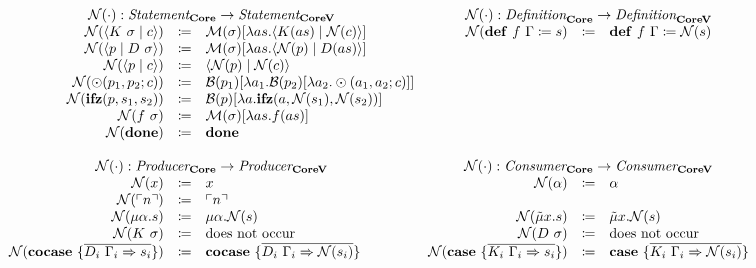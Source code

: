 \[
  \begin{array}{rclrcl}
    \\
    \multicolumn{3}{c}{\name{\cdot} : \emph{Statement}_{\targetlang{}} \rightarrow \emph{Statement}_{\targetvar{}}} &
    \multicolumn{3}{c}{\name{\cdot} : \emph{Definition}_{\targetlang{}} \rightarrow \emph{Definition}_{\targetvar{}}} \\
    \name{\cut{K\ \sigma}{c}} & \coloneq & \binds{\sigma}{\lambda as.\cut{K(as)}{\name{c}}} &
    \name{\defi{f\ \Gamma}{s}} & \coloneq & \defi{f\ \Gamma}{\name{s}} \\
    \name{\cut{p}{D\ \sigma}} & \coloneq & \binds{\sigma}{\lambda as.\cut{\name{p}}{D(as)}} \\
    \name{\cut{p}{c}} & \coloneq & \cut{\name{p}}{\name{c}} \\
    \name{\odot(p_1, p_2; c)}{} & \coloneq & \bind{p_1}{\lambda a_1.\bind{p_2}{\lambda a_2.\odot(a_1, a_2; c)}} \\
    \name{\ifz{p}{s_1}{s_2}}{} & \coloneq & \bind{p}{\lambda a.\ifz{a}{\name{s_1}}{\name{s_2}}} \\
    \name{f\ \sigma}{} & \coloneq & \binds{\sigma}{\lambda as.f(as)} \\
    \name{\done}{} & \coloneq & \done \\
    \\
    \multicolumn{3}{c}{\name{\cdot} : \emph{Producer}_{\targetlang{}} \rightarrow \emph{Producer}_{\targetvar{}}} &
    \multicolumn{3}{c}{\name{\cdot} : \emph{Consumer}_{\targetlang{}} \rightarrow \emph{Consumer}_{\targetvar{}}} \\
    \name{x} & \coloneq & x &
    \name{\alpha} & \coloneq & \alpha \\
    \name{\lit{n}} & \coloneq & \lit{n} & & & \\
    \name{\mu\alpha.s} & \coloneq & \mu\alpha.\name{s} &
    \name{\tilde{\mu}x.s} & \coloneq & \tilde{\mu}x.\name{s} \\
    \name{K\ \sigma} & \coloneq & \text{does not occur} &
    \name{D\ \sigma} & \coloneq & \text{does not occur} \\
    \name{\cocase{\overline{D_i\ \Gamma_i \Rightarrow s_i}}} & \coloneq & \cocase{\overline{D_i\ \Gamma_i \Rightarrow \name{s_i}}} &
    \name{\case{\overline{K_i\ \Gamma_i \Rightarrow s_i}}} & \coloneq & \case{\overline{K_i\ \Gamma_i \Rightarrow \name{s_i}}} \\
    \\
  \end{array}
\]

